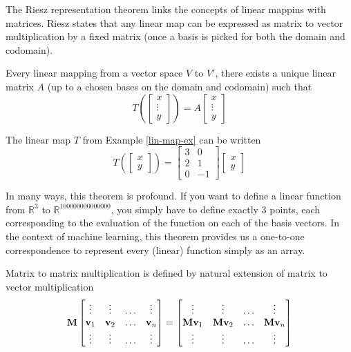 The Riesz representation theorem links the concepts of linear mappins with matrices. Riesz states that any linear map can be expressed as matrix to vector multiplication by a fixed matrix (once a basis is picked for both the domain and codomain).

\begin{theorem} Every linear mapping from a vector space $V$ to $V'$, there exists a unique linear matrix $A$ (up to a chosen bases on the domain and codomain) such that 
$$T\left(\begin{bmatrix}x \\ \vdots \\ y\end{bmatrix}\right) = A \begin{bmatrix}x \\ \vdots \\ y\end{bmatrix}$$
\end{theorem}

\begin{example}
The linear map $T$ from Example \ref{lin-map-ex} can be written 
$$T\left(\begin{bmatrix}x \\y\end{bmatrix}\right) 
= 
\begin{bmatrix}
3 & 0 \\
2 & 1 \\
0 & -1
\end{bmatrix} 
\begin{bmatrix}
x \\
y
\end{bmatrix}$$
\end{example}

In many ways, this theorem is profound. If you want to define a linear function from $\mathbb R^3$ to $\mathbb R^{100000000000000}$, you simply have to define exactly 3 points, each corresponding to the evaluation of the function on each of the basis vectors. In the context of machine learning, this theorem provides us a one-to-one correspondence to represent every (linear) function simply as an array. 

\begin{definition}
Matrix to matrix multiplication is defined by natural extension of matrix to vector multiplication
$$\MM \begin{bmatrix}
\vdots & \vdots & \ldots & \vdots \\
\vv_1 & \vv_2 & \ldots & \vv_n \\
\vdots & \vdots & \ldots & \vdots \\
\end{bmatrix} = \begin{bmatrix}
\vdots & \vdots & \ldots & \vdots \\
\MM \vv_1 & \MM \vv_2 & \ldots & \MM\vv_n \\
\vdots & \vdots & \ldots & \vdots \\
\end{bmatrix}$$
\end{definition}

